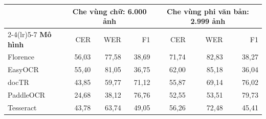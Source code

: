 \begin{tabular*}{\linewidth}{@{\extracolsep{\fill}}lrrrrrr@{}}
\toprule
& \multicolumn{3}{c}{\textbf{Che vùng chữ: 6.000 ảnh}} &
\multicolumn{3}{c}{\textbf{Che vùng phi văn bản: 2.999 ảnh}} \\
\cmidrule(lr){2-4}\cmidrule(lr){5-7}
\textbf{Mô hình} & CER & WER & F1 & CER & WER & F1 \\
\midrule
Florence & 56,03 & 77,58 & 38,69 & 71,74 & 82,83 & 38,27 \\
EasyOCR & 55,40 & 81,05 & 36,75 & 62,00 & 85,18 & 36,04 \\
docTR & 43,85 & 59,77 & 71,12 & 55,87 & 69,14 & 76,02 \\
PaddleOCR & 24,68 & 38,12 & 76,76 & 52,55 & 53,51 & 79,73 \\
Tesseract & 43,78 & 63,74 & 49,05 & 56,26 & 72,48 & 45,41 \\
\bottomrule
\end{tabular*}
